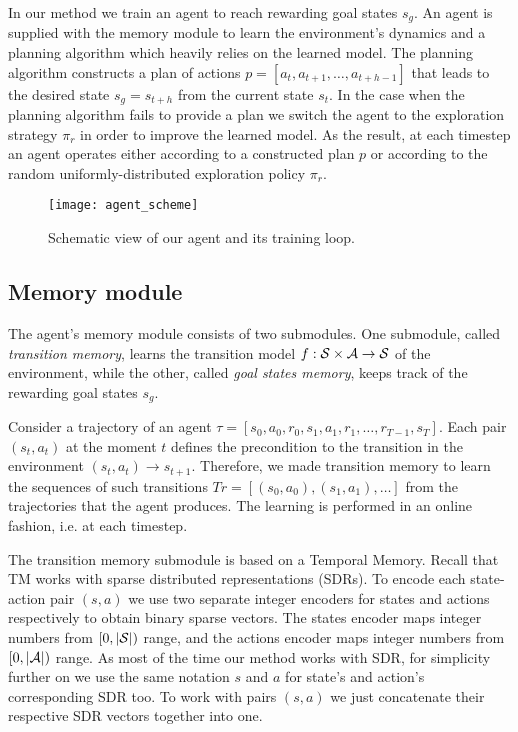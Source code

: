 \documentclass[a4paper,twoside]{article}
\begin{document}
In our method we train an agent to reach rewarding goal states $s_g$. An agent is supplied with the memory module to learn the environment's dynamics and a planning algorithm which heavily relies on the learned model. The planning algorithm constructs a plan of actions $p = [a_t, a_{t+1}, \dots, a_{t+h-1}]$ that leads to the desired state $s_g = s_{t+h}$ from the current state $s_t$. In the case when the planning algorithm fails to provide a plan we switch the agent to the exploration strategy $\pi_r$ in order to improve the learned model. As the result, at each timestep an agent operates either according to a constructed plan $p$ or according to the random uniformly-distributed exploration policy $\pi_r$.

\begin{figure}
  \centering
  \texttt{[image: agent\_scheme]}
  \caption{Schematic view of our agent and its training loop.} \label{fig_agent_scheme}
\end{figure}

\subsection{Memory module} \label{sec_MemoryModule}

The agent's memory module consists of two submodules. One submodule, called \textit{transition memory}, learns the transition model $f: \mathcal{S} \times \mathcal{A} \rightarrow \mathcal{S}$ of the environment, while the other, called \textit{goal states memory}, keeps track of the rewarding goal states $s_g$.

Consider a trajectory of an agent $\tau = [s_0, a_0, r_0, s_1, a_1, r_1, \dots, r_{T-1}, s_T]$. Each pair $(s_t, a_t)$ at the moment $t$ defines the precondition to the transition in the environment $(s_t, a_t) \rightarrow s_{t+1}$. Therefore, we made transition memory to learn the sequences of such transitions $Tr = [(s_0, a_0), (s_1, a_1), \dots]$ from the trajectories that the agent produces. The learning is performed in an online fashion, i.e. at each timestep.

The transition memory submodule is based on a Temporal Memory. Recall that TM works with sparse distributed representations (SDRs). To encode each state-action pair $(s, a)$ we use two separate integer encoders for states and actions respectively to obtain binary sparse vectors. The states encoder maps integer numbers from $[0, |\mathcal{S}|)$ range, and the actions encoder maps integer numbers from $[0, |\mathcal{A}|)$ range. As most of the time our method works with SDR, for simplicity further on we use the same notation $s$ and $a$ for state's and action's corresponding SDR too. To work with pairs $(s, a)$ we just concatenate their respective SDR vectors together into one.
\end{document}
